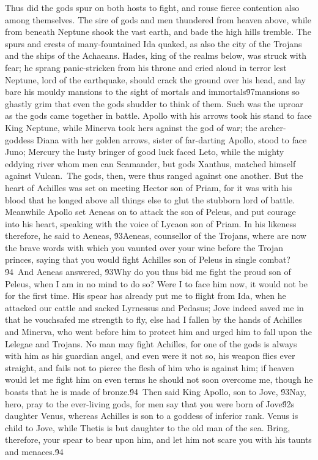 {Thus did the gods spur on both hosts to fight, and rouse fierce contention also among themselves. The sire of gods and men thundered from heaven above, while from beneath Neptune shook the vast earth, and bade the high hills tremble. The spurs and crests of many-fountained Ida quaked, as also the city of the Trojans and the ships of the Achaeans. Hades, king of the realms below, was struck with fear; he sprang panic-stricken from his throne and cried aloud in terror lest Neptune, lord of the earthquake, should crack the ground over his head, and lay bare his mouldy mansions to the sight of mortals and immortals\'97mansions so ghastly grim that even the gods shudder to think of them. Such was the uproar as the gods came together in battle. Apollo with his arrows took his stand to face King Neptune, while Minerva took hers against the god of war; the archer-goddess Diana with her golden arrows, sister of far-darting Apollo, stood to face Juno; Mercury the lusty bringer of good luck faced Leto, while the mighty eddying river whom men can Scamander, but gods Xanthus, matched himself against Vulcan.\
The gods, then, were thus ranged against one another. But the heart of Achilles was set on meeting Hector son of Priam, for it was with his blood that he longed above all things else to glut the stubborn lord of battle. Meanwhile Apollo set Aeneas on to attack the son of Peleus, and put courage into his heart, speaking with the voice of Lycaon son of Priam. In his likeness therefore, he said to Aeneas, \'93Aeneas, counsellor of the Trojans, where are now the brave words with which you vaunted over your wine before the Trojan princes, saying that you would fight Achilles son of Peleus in single combat?\'94\
And Aeneas answered, \'93Why do you thus bid me fight the proud son of Peleus, when I am in no mind to do so? Were I to face him now, it would not be for the first time. His spear has already put me to flight from Ida, when he attacked our cattle and sacked Lyrnessus and Pedasus; Jove indeed saved me in that he vouchsafed me strength to fly, else had I fallen by the hands of Achilles and Minerva, who went before him to protect him and urged him to fall upon the Lelegae and Trojans. No man may fight Achilles, for one of the gods is always with him as his guardian angel, and even were it not so, his weapon flies ever straight, and fails not to pierce the flesh of him who is against him; if heaven would let me fight him on even terms he should not soon overcome me, though he boasts that he is made of bronze.\'94\
Then said King Apollo, son to Jove, \'93Nay, hero, pray to the ever-living gods, for men say that you were born of Jove\'92s daughter Venus, whereas Achilles is son to a goddess of inferior rank. Venus is child to Jove, while Thetis is but daughter to the old man of the sea. Bring, therefore, your spear to bear upon him, and let him not scare you with his taunts and menaces.\'94\
}
